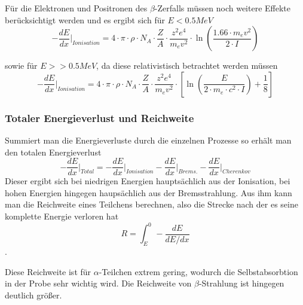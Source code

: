 Für die Elektronen und Positronen des $\beta$-Zerfalls müssen noch weitere Effekte berücksichtigt werden und es ergibt sich für $ E < 0.5 MeV$
\begin{equation}
 - \frac{dE}{dx} \rvert_{Ionisation} = 4 \cdot \pi \cdot \rho \cdot N_A \cdot \frac{Z}{A} \cdot \frac{z^2e^4}{m_e v^2} \cdot \ln \left( \frac{1.66 \cdot m_ev^2}{2 \cdot I} \right)
\end{equation}

sowie für $ E >> 0.5 MeV$, da diese relativistisch betrachtet werden müssen
\begin{equation}
 - \frac{dE}{dx} \rvert_{Ionisation} = 4 \cdot \pi \cdot \rho \cdot N_A \cdot \frac{Z}{A} \cdot \frac{z^2e^4}{m_e v^2} \cdot  \left[ \ln \left( \frac{E}{2 \cdot m_e \cdot c^2 \cdot I} \right) + \frac{1}{8} \right]
\end{equation}

\subsubsection{Totaler Energieverlust und Reichweite}

Summiert man die Energieverluste durch die einzelnen Prozesse so erhält man den totalen Energieverlust
\begin{equation}
 - \frac{dE}{dx} \rvert_{Total} = - \frac{dE}{dx} \rvert_{Ionisation} - \frac{dE}{dx} \rvert_{Brems.} - \frac{dE}{dx} \rvert_{Cherenkov}
\end{equation}
Dieser ergibt sich bei niedrigen Energien hauptsächlich aus der Ionisation, bei hohen Energien hingegen haupsächlich aus der Bremsstrahlung. Aus ihm kann man die Reichweite eines Teilchens berechnen, also die Strecke nach der es seine komplette Energie verloren hat
\begin{equation}
 R = \int_E^0 - \frac{dE}{dE/dx}
\end{equation}.

Diese Reichweite ist für $\alpha$-Teilchen extrem gering, wodurch die Selbstabsorbtion in der Probe sehr wichtig wird. Die Reichweite von $\beta$-Strahlung ist hingegen deutlich größer.  


